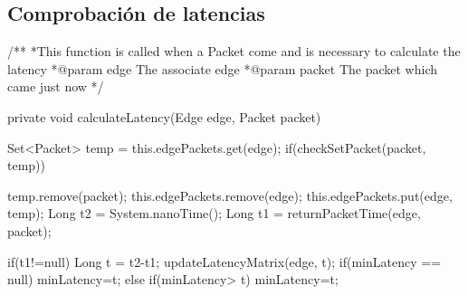 \documentclass[a4paper,11pt]{book}
\begin{document}
\newpage
\subsection{Comprobación de latencias}\label{checkLatency}
\begin{java}
  /**
    *This function is called when a Packet come and is necessary to calculate the latency
    *@param edge The associate edge
    *@param packet The packet which came just now
    */

    private void calculateLatency(Edge edge, Packet packet){

      Set<Packet> temp = this.edgePackets.get(edge);
      if(checkSetPacket(packet, temp)){
        temp.remove(packet);
        this.edgePackets.remove(edge);
        this.edgePackets.put(edge, temp);
        Long t2 = System.nanoTime();
        Long t1 = returnPacketTime(edge, packet);

        if(t1!=null){
          Long t = t2-t1;
          updateLatencyMatrix(edge, t);
          if(minLatency == null){
            minLatency=t;
          }
          else if(minLatency> t){
            minLatency=t;
          }
        }

      }

    }
\end{java}

\newpage
\end{document}

